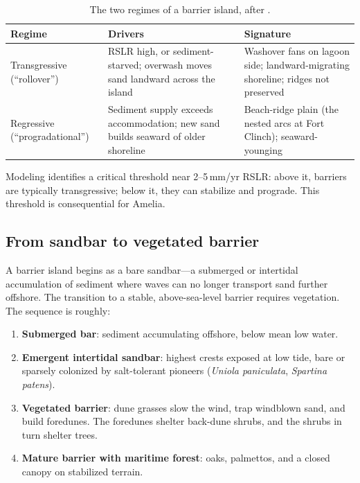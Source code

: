 \documentclass[11pt]{article}
\begin{document}
\begin{table}[h]
\centering
\caption{The two regimes of a barrier island, after \cite{mariotti2021}.}
\label{tab:regimes}
\begin{tabular}{p{3.5cm} p{5.5cm} p{5cm}}
\toprule
\textbf{Regime} & \textbf{Drivers} & \textbf{Signature} \\
\midrule
Transgressive (``rollover'') &
RSLR high, or sediment-starved; overwash moves sand landward across the island &
Washover fans on lagoon side; landward-migrating shoreline; ridges not preserved \\
\addlinespace
Regressive (``progradational'') &
Sediment supply exceeds accommodation; new sand builds seaward of older shoreline &
Beach-ridge plain (the nested arcs at Fort Clinch); seaward-younging \\
\bottomrule
\end{tabular}
\end{table}

Modeling \cite{mariotti2021} identifies a critical threshold near 2--5\,mm/yr RSLR:
above it, barriers are typically transgressive; below it, they can stabilize and
prograde. This threshold is consequential for Amelia.

\subsection{From sandbar to vegetated barrier}

A barrier island begins as a bare sandbar---a submerged or intertidal
accumulation of sediment where waves can no longer transport sand further
offshore. The transition to a stable, above-sea-level barrier requires
vegetation. The sequence is roughly:

\begin{enumerate}[leftmargin=2em]
\item \textbf{Submerged bar}: sediment accumulating offshore, below mean low
water.
\item \textbf{Emergent intertidal sandbar}: highest crests exposed at low
tide, bare or sparsely colonized by salt-tolerant pioneers (\emph{Uniola
paniculata}, \emph{Spartina patens}).
\item \textbf{Vegetated barrier}: dune grasses slow the wind, trap windblown
sand, and build foredunes. The foredunes shelter back-dune shrubs, and the
shrubs in turn shelter trees.
\item \textbf{Mature barrier with maritime forest}: oaks, palmettos, and a
closed canopy on stabilized terrain.
\end{enumerate}
\end{document}
